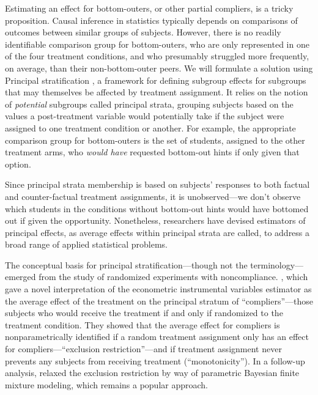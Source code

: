 \documentclass[]{article}
\begin{document}
Estimating an effect for bottom-outers, or other partial compliers, is a tricky proposition.
Causal inference in statistics typically depends on comparisons of outcomes between similar groups of subjects. However, there is no readily identifiable comparison group for bottom-outers, who are only represented in one of the four treatment conditions, and who presumably struggled more frequently, on average, than their non-bottom-outer peers.
We will formulate a solution using Principal stratification \citep{frangakis}, a  framework for defining subgroup effects for subgroups that may themselves be affected by treatment assignment. It relies on the notion of \emph{potential} subgroups called principal strata, grouping subjects based on the values a post-treatment variable would potentially take if the subject were assigned to one treatment condition or another.
For example, the appropriate comparison group for bottom-outers is the set of students, assigned to the other treatment arms, who \emph{would have} requested bottom-out hints if only given that option.

Since principal strata membership is based on subjects' responses to both factual and counter-factual treatment assignments, it is unobserved---we don't observe which students in the conditions without bottom-out hints would have bottomed out if given the opportunity.
Nonetheless, researchers have devised estimators of principal effects, as average effects within principal strata are called, to address a broad range of applied statistical problems.

The conceptual basis for principal stratification---though not the terminology---emerged from the study of randomized experiments with noncompliance. \citet{air}, which gave a novel interpretation of the econometric instrumental variables estimator as the average effect of the treatment on the principal stratum of ``compliers''---those subjects who would receive the treatment if and only if randomized to the treatment condition. They showed that the average effect for compliers is nonparametrically identified if a random treatment assignment only has an effect for compliers---``exclusion restriction''---and if treatment assignment never prevents any subjects from receiving treatment (``monotonicity'').
In a follow-up analysis, \citet{imbens1997bayesian} relaxed the exclusion restriction by way of parametric Bayesian finite mixture modeling, which remains a popular approach.
\end{document}
